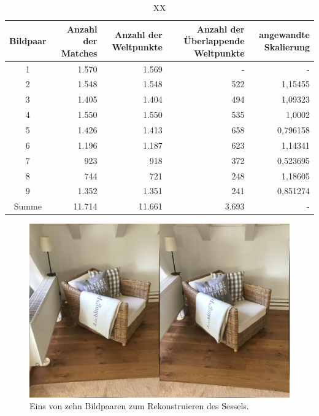 \begin{table}
    \begin{tabularx}{\textwidth}{c r r r r}
        \toprule
        Bildpaar &  Anzahl der Matches & Anzahl der Weltpunkte & Anzahl der Überlappende Weltpunkte & angewandte Skalierung \\ 
        \midrule
        1 & 1.570 & 1.569 & -  & - \\
        2 & 1.548 & 1.548 & 522 & 1,15455 \\
        3 & 1.405 & 1.404 & 494 & 1,09323 \\
        4 & 1.550 & 1.550 & 535 & 1,0002 \\
        5 & 1.426 & 1.413 & 658 & 0,796158 \\
        6 & 1.196 & 1.187 & 623 & 1,14341 \\
        7 & 923 & 918 & 372 & 0,523695 \\
        8 & 744 & 721 & 248 & 1,18605 \\
        9 & 1.352 & 1.351 & 241 & 0,851274 \\
        \midrule
        Summe & 11.714 & 11.661 & 3.693 & - \\
        \bottomrule
    \end{tabularx}
    \caption{XX}
    \label{tab:chair-results}
\end{table}

\begin{figure}
    \includegraphics[width=\textwidth]{src/img/chair_first_pair.jpg}
    \caption{Eins von zehn Bildpaaren zum Rekonstruieren des Sessels.}
    \label{fig:chair-first-pair}
\end{figure}

